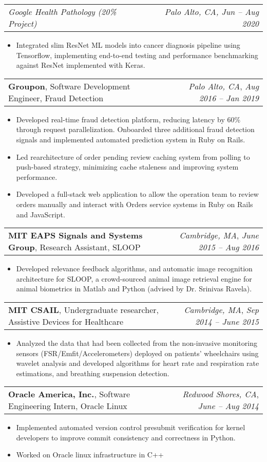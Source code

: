 \documentclass[letterpaper,11pt]{article}
\makeatletter
\newcommand{\resumeItem}[1]{
  \item\small{
    {#1 \vspace{-2pt}}
  }
}
\newcommand{\resumeSubheading}[4]{
  \vspace{-1pt}\item
    \begin{tabular*}{0.97\textwidth}[t]{l@{\extracolsep{\fill}}r}
      \textbf{#1}{, #2} &  \textit{\small#3}{, \textit{\small #4}} \\
    \end{tabular*}\vspace{-5pt}
}
\newcommand{\resumeSubSubheadingMultiteam}[4]{
    \begin{tabular*}{0.97\textwidth}{l@{\extracolsep{\fill}}r}
      \textit{\small#1}{ \scriptsize #4} & \textit{\small #2, #3} \\
    \end{tabular*}
    
    \vspace{-10pt}
}
\newcommand{\resumeItemListStart}{\begin{itemize}}
\newcommand{\resumeItemListEnd}{\end{itemize}\vspace{-5pt}}
\makeatother
\begin{document}
  \resumeSubSubheadingMultiteam
   {Google Health Pathology (20\% Project)}{Palo Alto, CA}{Jun -- Aug 2020}{}
      \resumeItemListStart
\resumeItem{Integrated slim ResNet ML models into cancer diagnosis pipeline using Tensorflow, implementing end-to-end testing and performance benchmarking against ResNet implemented with Keras.}
      \resumeItemListEnd


    \resumeSubheading
      {Groupon}{Software Development Engineer, Fraud Detection}
      {Palo Alto, CA}{Aug 2016 -- Jan 2019}
      
      \resumeItemListStart
        \resumeItem{Developed real-time fraud detection platform, reducing latency by 60\% through request parallelization. Onboarded three additional fraud detection signals and implemented automated prediction system in Ruby on Rails.}
        \resumeItem{Led rearchitecture of order pending review caching system from polling to push-based strategy, minimizing cache staleness and improving system performance.}
        \resumeItem{Developed a full-stack web application to allow the operation team to review orders manually and interact with Orders service systems in Ruby on Rails and JavaScript.}
      \resumeItemListEnd

    \resumeSubheading
      {MIT EAPS Signals and Systems Group}{Research Assistant, SLOOP}
      {Cambridge, MA}{June 2015 -- Aug 2016}
      \resumeItemListStart
        \resumeItem{Developed relevance feedback algorithms, and automatic image recognition architecture for SLOOP, a crowd-sourced animal image retrieval engine for animal biometrics in Matlab and Python (advised by Dr. Srinivas Ravela).}
      \resumeItemListEnd

    \resumeSubheading
      {MIT CSAIL}{Undergraduate researcher, Assistive Devices for Healthcare}
      {Cambridge, MA}{Sep 2014 -- June 2015}
      \resumeItemListStart
        \resumeItem{Analyzed the data that had been collected from the non-invasive monitoring sensors (FSR/Emfit/Accelerometers) deployed on patients’ wheelchairs using wavelet analysis and developed algorithms for heart rate and respiration rate estimations, and breathing suspension detection.}
      \resumeItemListEnd

    \resumeSubheading
      {Oracle America, Inc.}{Software Engineering Intern, Oracle Linux}
      {Redwood Shores, CA}{June -- Aug 2014}
      \resumeItemListStart
        \resumeItem{Implemented automated version control presubmit verification for kernel developers to improve commit consistency and correctness in Python.}
        \resumeItem{Worked on Oracle linux infrastructure in C++}
      \resumeItemListEnd
\end{document}
